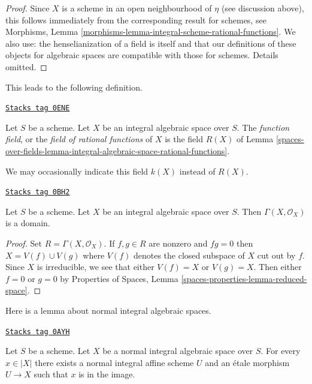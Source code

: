 \begin{proof}
Since $X$ is a scheme in an open neighbourhood of $\eta$ (see discussion
above), this follows immediately from the corresponding result for
schemes, see Morphisms, Lemma
\ref{morphisms-lemma-integral-scheme-rational-functions}.
We also use: the henselianization of a field is itself
and that our definitions of these objects
for algebraic spaces are compatible with those for schemes.
Details omitted.
\end{proof}

This leads to the following definition.

\begin{definition}
\label{spaces-over-fields-definition-function-field}
\href{https://stacks.math.columbia.edu/tag/0ENE}{\texttt{Stacks tag 0ENE}}

Let $S$ be a scheme. Let $X$ be an integral algebraic space over $S$.
The {\it function field}, or the {\it field of rational functions}
of $X$ is the field $R(X)$ of
Lemma \ref{spaces-over-fields-lemma-integral-algebraic-space-rational-functions}.
\end{definition}

We may occasionally indicate this field $k(X)$ instead of $R(X)$.

\begin{lemma}
\label{spaces-over-fields-lemma-integral-sections}
\href{https://stacks.math.columbia.edu/tag/0BH2}{\texttt{Stacks tag 0BH2}}

Let $S$ be a scheme. Let $X$ be an integral algebraic space over $S$.
Then $\Gamma(X, \mathcal{O}_X)$ is a domain.
\end{lemma}

\begin{proof}
Set $R = \Gamma(X, \mathcal{O}_X)$. If $f, g \in R$ are nonzero and
$fg = 0$ then $X = V(f) \cup V(g)$ where $V(f)$ denotes the closed subspace
of $X$ cut out by $f$. Since $X$ is irreducible, we see that either
$V(f) = X$ or $V(g) = X$. Then either $f = 0$ or $g = 0$ by
Properties of Spaces, Lemma \ref{spaces-properties-lemma-reduced-space}.
\end{proof}

Here is a lemma about normal integral algebraic spaces.

\begin{lemma}
\label{spaces-over-fields-lemma-normal-integral-cover-by-affines}
\href{https://stacks.math.columbia.edu/tag/0AYH}{\texttt{Stacks tag 0AYH}}

Let $S$ be a scheme. Let $X$ be a normal integral algebraic space over $S$.
For every $x \in |X|$ there exists a normal integral affine scheme $U$
and an \'etale morphism $U \to X$ such that $x$ is in the image.
\end{lemma}


